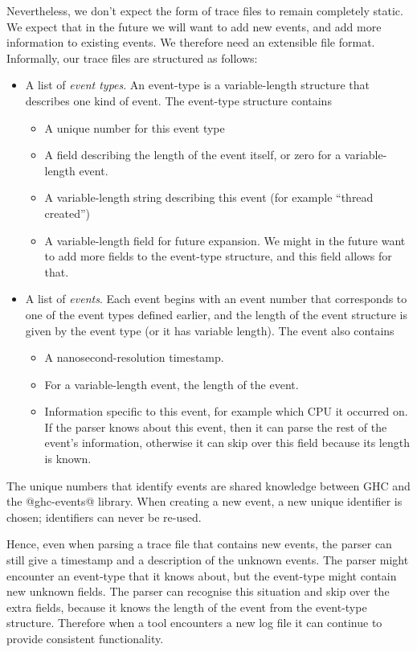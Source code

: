 \documentclass[twocolumn,9pt]{sigplanconf}
\begin{document}
Nevertheless, we don't expect the form of trace files to remain
completely static.  We expect that in the future we will want to add
new events, and add more information to existing events.  We therefore
need an extensible file format.  Informally, our trace files are
structured as follows:

\begin{itemize}
\item A list of \emph{event types}.  An event-type is a
  variable-length structure that describes one kind of event.  The
  event-type structure contains
  \begin{itemize}
    \item A unique number for this event type
    \item A field describing the length of the event itself, or zero
      for a variable-length event.
    \item A variable-length string describing this event (for example
      ``thread created'')
    \item A variable-length field for future expansion.  We might in
      the future want to add more fields to the event-type structure,
      and this field allows for that.
  \end{itemize}
\item A list of \emph{events}.  Each event begins with an event number
  that corresponds to one of the event types defined earlier, and the
  length of the event structure is given by the event type (or it has
  variable length).  The event also contains
  \begin{itemize}
  \item A nanosecond-resolution timestamp.
  \item For a variable-length event, the length of the event.
  \item Information specific to this event, for example which CPU it
    occurred on.  If the parser knows about this event, then it can
    parse the rest of the event's information, otherwise it can skip
    over this field because its length is known.
  \end{itemize}
\end{itemize}

The unique numbers that identify events are shared knowledge between
GHC and the @ghc-events@ library.  When creating a new event, a new
unique identifier is chosen; identifiers can never be re-used.

Hence, even when parsing a trace file that contains new events, the
parser can still give a timestamp and a description of the unknown
events.  The parser might encounter an event-type that it knows about,
but the event-type might contain new unknown fields.  The parser can
recognise this situation and skip over the extra fields, because it
knows the length of the event from the event-type structure.
Therefore when a tool encounters a new log file it can continue to
provide consistent functionality.
\end{document}
